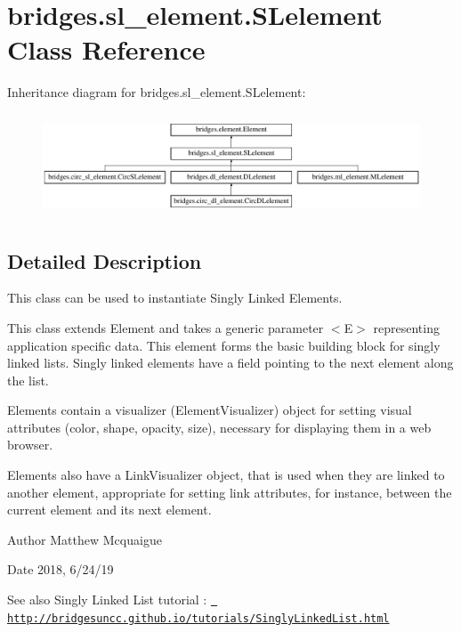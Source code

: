 \hypertarget{classbridges_1_1sl__element_1_1_s_lelement}{}\section{bridges.\+sl\+\_\+element.\+S\+Lelement Class Reference}
\label{classbridges_1_1sl__element_1_1_s_lelement}
Inheritance diagram for bridges.\+sl\+\_\+element.\+S\+Lelement\+:\begin{figure}[H]
\begin{center}
\leavevmode
\includegraphics[height=3.085400cm]{classbridges_1_1sl__element_1_1_s_lelement}
\end{center}
\end{figure}


\subsection{Detailed Description}
This class can be used to instantiate Singly Linked Elements. 

This class extends Element and takes a generic parameter $<$\+E$>$ representing application specific data. This element forms the basic building block for singly linked lists. Singly linked elements have a field pointing to the next element along the list.

Elements contain a visualizer (Element\+Visualizer) object for setting visual attributes (color, shape, opacity, size), necessary for displaying them in a web browser.

Elements also have a Link\+Visualizer object, that is used when they are linked to another element, appropriate for setting link attributes, for instance, between the current element and its next element.

\begin{DoxyAuthor}{Author}
Matthew Mcquaigue 
\end{DoxyAuthor}
\begin{DoxyDate}{Date}
2018, 6/24/19
\end{DoxyDate}
\begin{DoxySeeAlso}{See also}
Singly Linked List tutorial \+: \href{http://bridgesuncc.github.io/tutorials/SinglyLinkedList.html}{\texttt{ http\+://bridgesuncc.\+github.\+io/tutorials/\+Singly\+Linked\+List.\+html}} 
\end{DoxySeeAlso}
